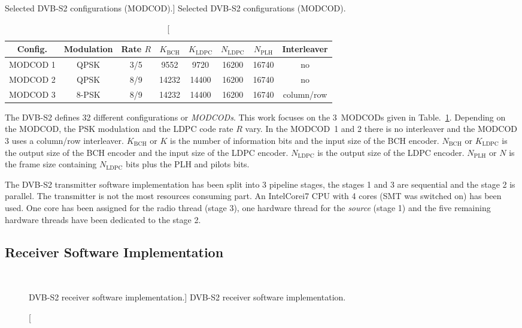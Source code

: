 \begin{table}[htp]
  \centering
  \caption
    [Selected DVB-S2 configurations (MODCOD).]
    {Selected DVB-S2 configurations (MODCOD).}
  \label{tab:sdr_dvbs2_modcod}
  \begin{tabular}{c c c c c c c c}
  \toprule
  Config. & Modulation & Rate $R$ & $K_\text{BCH}$ & $K_\text{LDPC}$ & $N_\text{LDPC}$ & $N_\text{PLH}$ & Interleaver \\
  \midrule
  MODCOD 1 &  QPSK & 3/5 &  9552 &  9720 & 16200 & 16740 & no\\
  MODCOD 2 &  QPSK & 8/9 & 14232 & 14400 & 16200 & 16740 & no\\
  MODCOD 3 & 8-PSK & 8/9 & 14232 & 14400 & 16200 & 16740 & column/row\\
  \bottomrule
  \end{tabular}
\end{table}

The DVB-S2 defines 32 different configurations or \emph{MODCODs}. This work
focuses on the 3~MODCODs given in Table.~\ref{tab:sdr_dvbs2_modcod}. Depending
on the MODCOD, the PSK modulation and the LDPC code rate $R$ vary. In the
MODCOD~1 and 2 there is no interleaver and the MODCOD 3 uses a column/row
interleaver. $K_\text{BCH}$ or $K$ is the number of information bits and the
input size of the BCH encoder. $N_\text{BCH}$ or $K_\text{LDPC}$ is the output
size of the BCH encoder and the input size of the LDPC encoder. $N_\text{LDPC}$
is the output size of the LDPC encoder. $N_\text{PLH}$ or $N$ is the frame size
containing $N_\text{LDPC}$ bits plus the PLH and pilots bits.

The DVB-S2 transmitter software implementation has been split into 3 pipeline
stages, the stages 1 and 3 are sequential and the stage 2 is parallel. The
transmitter is not the most resources consuming part. An Intel\R Core\TM i7 CPU
with 4 cores (SMT was switched on) has been used. One core has been assigned for
the radio thread (stage 3), one hardware thread for the \emph{source} (stage 1)
and the five remaining hardware threads have been dedicated to the stage 2.

\subsection{Receiver Software Implementation}

\begin{figure}[htp]
  \centering
  \\
  \caption
    [DVB-S2 receiver software implementation.]
    {DVB-S2 receiver software implementation.}
  \label{fig:sdr_dvbs2_receiver}
\end{figure}

